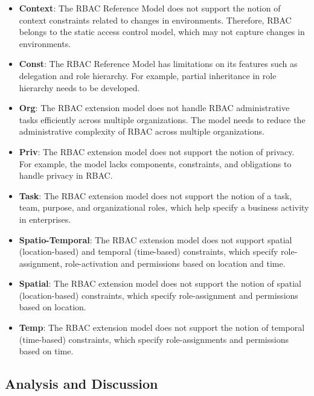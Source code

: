 \begin{itemize}

  \item \textbf{Context}: The RBAC Reference Model does not support the notion of context constraints  related to changes in environments. Therefore, RBAC belongs to the static access control model, which may not capture changes in environments.
 
  \item \textbf{Const}: The RBAC Reference Model has limitations on its features such as delegation and role hierarchy. For example, partial inheritance in role hierarchy needs to be developed.
  
  \item \textbf{Org}: The RBAC extension model does not handle RBAC administrative tasks efficiently across multiple organizations. The model needs to reduce the administrative complexity of RBAC across multiple organizations.
   
  \item \textbf{Priv}: The RBAC extension model does not support the notion of privacy. For example, the model lacks components, constraints, and obligations to handle privacy in RBAC.
  
  \item \textbf{Task}: The RBAC extension model does not support the notion of a task, team, purpose, and organizational roles, which help specify a business activity in enterprises.
    
  \item \textbf{Spatio-Temporal}: The RBAC extension model does not support spatial (location-based) and temporal (time-based) constraints, which specify role-assignment, role-activation and permissions based on location and time.
  
  \item \textbf{Spatial}: The RBAC extension model does not support the notion of spatial (location-based)  constraints, which specify role-assignment and permissions based on location.
        
  \item \textbf{Temp}: The RBAC extension model does not support the notion of temporal (time-based)  constraints, which specify role-assignments and permissions based on time.
      
	
\end{itemize}
 

\subsection{Analysis and Discussion}

